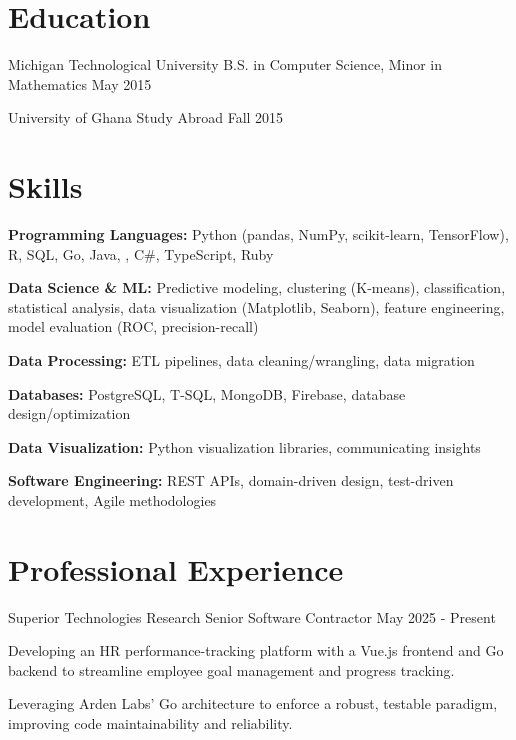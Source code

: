 \documentclass{../styles/cv}
\begin{document}
\populatedtitle

\section{Education}
\subsectionlocationdate
    {Michigan Technological University}
    {B.S. in Computer Science, Minor in Mathematics}
    {May 2015}

\subsectionlocationdate
    {University of Ghana}
    {Study Abroad}
    {Fall 2015}


\section{Skills}
\resumesublistbegin
    \item \textbf{Programming Languages:} Python (pandas, NumPy, scikit-learn, TensorFlow), R, SQL, Go, Java, \cpp, C\#, TypeScript, Ruby
    \item \textbf{Data Science \& ML:} Predictive modeling, clustering (K-means), classification, statistical analysis, data visualization (Matplotlib, Seaborn), feature engineering, model evaluation (ROC, precision-recall)
    \item \textbf{Data Processing:} ETL pipelines, data cleaning/wrangling, data migration
    \item \textbf{Databases:} PostgreSQL, T-SQL, MongoDB, Firebase, database design/optimization
    \item \textbf{Data Visualization:} Python visualization libraries, communicating insights
    \item \textbf{Software Engineering:} REST APIs, domain-driven design, test-driven development, Agile methodologies
\resumesublistend

\section{Professional Experience}

\subsectionpositiondate
    {Superior Technologies Research}
    {Senior Software Contractor}
    {May 2025 - Present}
\resumesublistbegin
    \item Developing an HR performance-tracking platform with a Vue.js frontend and Go backend to streamline employee goal management and progress tracking.
    \item Leveraging Arden Labs' Go architecture to enforce a robust, testable paradigm, improving code maintainability and reliability.
\resumesublistend
\end{document}
